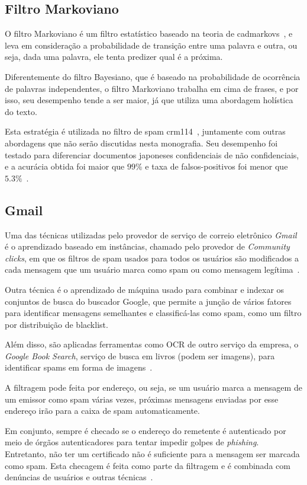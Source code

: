 \documentclass[a4paper,dvipdfm]{article}
\begin{document}
	\subsection{Filtro Markoviano}
		O filtro Markoviano é um filtro estatístico baseado na teoria de \glspl{cadmarkov}~\cite{markov}, e leva em consideração a probabilidade de transição entre uma palavra e outra, ou seja, dada uma palavra, ele tenta predizer qual é a próxima.

		Diferentemente do filtro Bayesiano, que é baseado na probabilidade de ocorrência de palavras independentes, o filtro Markoviano trabalha em cima de frases, e por isso, seu desempenho tende a ser maior, já que utiliza uma abordagem holística do texto.
		
	Esta estratégia é utilizada no filtro de spam \gls{crm114}~\cite{crm114}, juntamente com outras abordagens que não serão discutidas nesta monografia. Seu desempenho foi testado para diferenciar documentos japoneses confidenciais de não confidenciais, e a acurácia obtida foi maior que $99\%$ e taxa de falsos-positivos foi menor que $5.3\%$~\cite{fmarkov:japtest}.

	\subsection{Gmail}
		Uma das técnicas utilizadas pelo provedor de serviço de correio eletrônico \emph{Gmail} é o aprendizado baseado em instâncias, chamado pelo provedor de \emph{Community clicks}, em que os filtros de spam usados para todos os usuários são modificados a cada mensagem que um usuário marca como spam ou como mensagem legítima~\cite{gmail:fightspam}.

		Outra técnica é o aprendizado de máquina usado para combinar e indexar os conjuntos de busca do buscador Google, que permite a junção de vários fatores para identificar mensagens semelhantes e classificá-las como spam, como um filtro por distribuição de blacklist.
		
		Além disso, são aplicadas ferramentas como \gls{OCR} de outro serviço da empresa, o \emph{Google Book Search}, serviço de busca em livros (podem ser imagens), para identificar spams em forma de imagens~\cite{gmail:youtube}.

		A filtragem pode feita por endereço, ou seja, se um usuário marca a mensagem de um emissor como spam várias vezes, próximas mensagens enviadas por esse endereço irão para a caixa de spam automaticamente.

		Em conjunto, sempre é checado se o endereço do remetente é autenticado por meio de órgãos autenticadores para tentar impedir golpes de \emph{phishing}.
		Entretanto, não ter um certificado não é suficiente para a mensagem ser marcada como spam.
		Esta checagem é feita como parte da filtragem e é combinada com denúncias de usuários e outras técnicas~\cite{gmail:filtros}.
\end{document}
